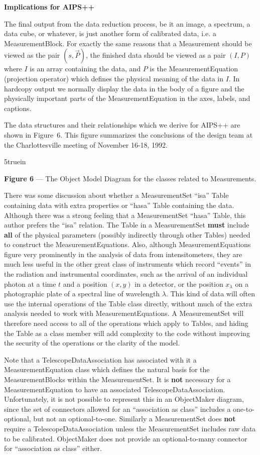 \medskip
\centerline{\bf Implications for AIPS++}

The final output from the data reduction process, be it an image, a spectrum,
a data cube, or whatever, is just another form of calibrated data, i.e. a
MeasurementBlock. For exactly the same reasons that a Measurement should 
be viewed as the pair $(s,\vec P)$, the finished data should be viewed as 
a pair $(I,P)$ where $I$ is an array containing the data, and $P$ is the 
MeasurementEquation (projection operator) which defines the physical meaning 
of the data in $I$. In hardcopy output we normally display the data in the
body of a figure and the physically important parts of the MeasurementEquation
in the axes, labels, and captions.

The data structures and their relationships which we derive for AIPS++ are 
shown in Figure~6. This figure summarizes the conclusions of the design team
at the Charlottesville meeting of November 16-18, 1992.

\epsfxsize 5truein
\centerline {}
\centerline {{\bf Figure 6} --- The Object Model Diagram for the classes
related to Measurements.}

There was some discussion about whether a MeasurementSet ``isa'' Table 
containing data with extra properties or ``hasa'' Table containing the data.
Although there was a strong feeling that a MeasurementSet ``hasa'' Table, 
this author prefers the ``isa'' relation. The Table in a MeasurementSet 
{\bf must} include {\bf all} of the physical parameters (possibly 
indirectly through other Tables) needed to construct the 
MeasurementEquations. Also, although MeasurementEquations
figure very prominently in the analysis of data from intensitometers, they are
much less useful in the other great class of instruments which record 
``events'' in the radiation and instrumental coordinates, such as the
arrival of an individual photon at a time $t$ and a position $(x,y)$ in a
detector, or the position $x_\lambda$ on a photographic plate of a spectral 
line of wavelength $\lambda$. This kind of data will often use the internal
operations of the Table class directly, without much of the extra analysis
needed to work with MeasurementEquations. A MeasurementSet will therefore
need access to all of the operations which apply to Tables, and 
hiding the Table as a class member will add complexity to the code without 
improving the security of the operations or the clarity of the model.

Note that a TelescopeDataAssociation has associated with it a 
MeasurementEquation class which defines the natural basis for the 
MeasurementBlocks within the MeasurementSet. It is {\bf not} necessary
for a MeasurementEquation to have an associated TelescopeDataAssociation.
Unfortunately, it is not possible to represent this in an ObjectMaker diagram,
since the set of connectors allowed for an ``association as class'' includes a
one-to-optional, but not an optional-to-one. Similarly a MeasurementSet
does {\bf not} require a TelescopeDataAssociation unless the MeasurementSet 
includes raw data to be calibrated. ObjectMaker does not provide an 
optional-to-many connector for ``association as class'' either. 


